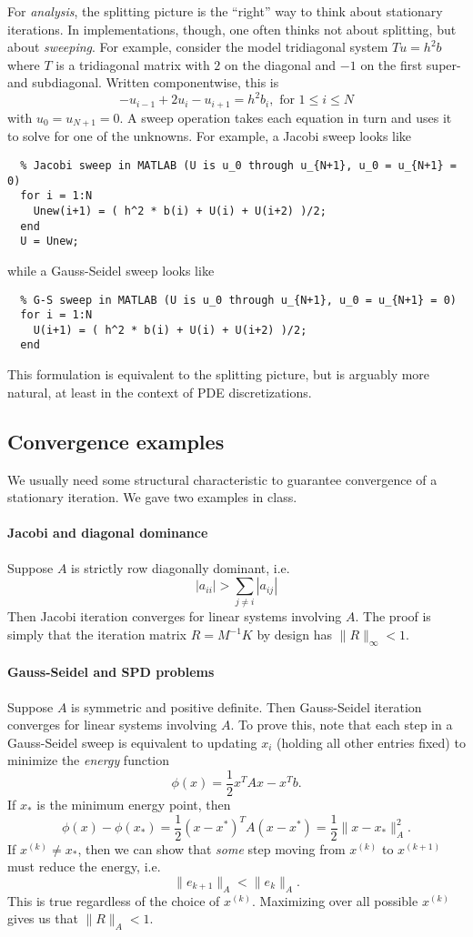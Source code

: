 \documentclass[12pt, leqno]{article}
\begin{document}
For {\em analysis}, the splitting picture is the ``right'' way to
think about stationary iterations.  In implementations, though, one often
thinks not about splitting, but about {\em sweeping}.  For example,
consider the model tridiagonal system $Tu = h^2 b$ where $T$ is a
tridiagonal matrix with $2$ on the diagonal and $-1$ on the first
super- and subdiagonal.  Written componentwise, this is
\[
  -u_{i-1} + 2 u_i - u_{i+1} = h^2 b_i, \mbox{ for } 1 \leq i \leq N
\]
with $u_0 = u_{N+1} = 0$.  A sweep operation takes each equation in
turn and uses it to solve for one of the unknowns.  For example,
a Jacobi sweep looks like
\begin{lstlisting}
  % Jacobi sweep in MATLAB (U is u_0 through u_{N+1}, u_0 = u_{N+1} = 0)
  for i = 1:N
    Unew(i+1) = ( h^2 * b(i) + U(i) + U(i+2) )/2;
  end
  U = Unew;
\end{lstlisting}
while a Gauss-Seidel sweep looks like
\begin{lstlisting}
  % G-S sweep in MATLAB (U is u_0 through u_{N+1}, u_0 = u_{N+1} = 0)
  for i = 1:N
    U(i+1) = ( h^2 * b(i) + U(i) + U(i+2) )/2;
  end
\end{lstlisting}
This formulation is equivalent to the splitting picture, but is
arguably more natural, at least in the context of PDE discretizations.

\subsection{Convergence examples}

We usually need some structural characteristic to guarantee
convergence of a stationary iteration.  We gave two examples
in class.

\paragraph{Jacobi and diagonal dominance}
Suppose $A$ is strictly row diagonally dominant, i.e.
\[
  |a_{ii}| > \sum_{j \neq i} |a_{ij}|
\]
Then Jacobi iteration converges for linear systems involving $A$.
The proof is simply that the iteration matrix $R = M^{-1} K$ by
design has $\|R\|_\infty < 1$.

\paragraph{Gauss-Seidel and SPD problems}
Suppose $A$ is symmetric and positive definite.  Then Gauss-Seidel
iteration converges for linear systems involving $A$.  To prove this,
note that each step in a Gauss-Seidel sweep is equivalent to updating
$x_i$ (holding all other entries fixed) to minimize the {\em energy}
function
\[
  \phi(x) = \frac{1}{2} x^T A x - x^T b.
\]
If $x_*$ is the minimum energy point, then
\[
  \phi(x)-\phi(x_*) = \frac{1}{2} (x-x^*)^T A (x-x^*) = \frac{1}{2} \|x-x_*\|_A^2.
\]
If $x^{(k)} \neq x_*$, then we can show that {\em some} step moving
from $x^{(k)}$ to $x^{(k+1)}$ must reduce the energy, i.e.
\[
  \|e_{k+1}\|_A < \|e_k\|_A.
\]
This is true regardless of the choice of $x^{(k)}$.  Maximizing
over all possible $x^{(k)}$ gives us that $\|R\|_A < 1$.
\end{document}
